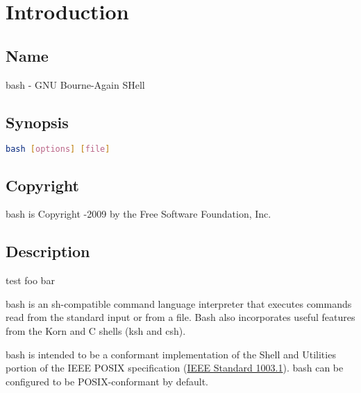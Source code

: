 \section{Introduction}
\subsection{Name}
bash - GNU Bourne-Again SHell

\subsection{Synopsis}
\label{sec:synopsis}
\noindent
\begin{lstlisting}[language=bash]
  bash [options] [file]
\end{lstlisting}

\subsection{Copyright}
\Gls{bash} is Copyright -2009 by the Free Software Foundation, Inc.

\subsection{Description}
\label{sec:description}
 
test foo bar
 
\Gls{bash} is an \gls{sh}-compatible command language interpreter that executes commands read from the standard input or from a file. Bash also incorporates useful features from the Korn and C shells (\gls{ksh} and \gls{csh}).

\Gls{bash} is intended to be a conformant implementation of the Shell and Utilities portion of the IEEE POSIX specification (\href{https://standards.ieee.org/standard/1003_1-2017.html}{IEEE Standard 1003.1}). \Gls{bash} can be configured to be POSIX-conformant by default.